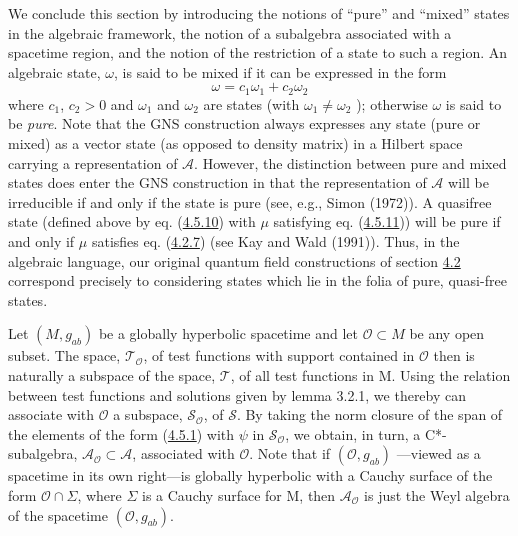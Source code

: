 \documentclass[11pt,a4paper]{article}
\begin{document}
We conclude this section by introducing the notions of ``pure'' and ``mixed'' states in the algebraic framework, the notion of a subalgebra associated with a spacetime region, and the notion of the restriction of a state to such a region. An algebraic state, \(\omega\), is said to be mixed if it can be expressed in the form
\begin{equation*}
\omega = c_1 \omega_1 + c_2 \omega_2 \tag{4.5.17}\label{eq:4.5.17}
\end{equation*}
where \(c_1\), \(c_2 > 0\) and \(\omega_1\) and \(\omega_2\) are states (with \(\omega_1 \neq \omega_2\) ); otherwise \(\omega\) is said to be \emph{pure}. Note that the GNS construction always expresses any state (pure or mixed) as a vector state (as opposed to density matrix) in a Hilbert space carrying a representation of \(\mathcal{A}\). However, the distinction between pure and mixed states does enter the GNS construction in that the representation of \(\mathcal{A}\) will be irreducible if \hypertarget{source-97}{} and only if the state is pure (see, e.g., Simon (1972)). A quasifree state (defined above by eq. (\hyperref[eq:4.5.10]{4.5.10}) with \(\mu\) satisfying eq. (\hyperref[eq:4.5.11]{4.5.11})) will be pure if and only if \(\mu\) satisfies eq. (\hyperref[eq:4.2.7]{4.2.7}) (see Kay and Wald (1991)). Thus, in the algebraic language, our original quantum field constructions of section \hyperlink{sec:4.2}{4.2} correspond precisely to considering states which lie in the folia of pure, quasi-free states.

Let \((M, g_{ab})\) be a globally hyperbolic spacetime and let \(\mathcal{O} \subset M\) be any open subset. The space, \(\mathcal{T}_{\mathcal{O}}\), of test functions with support contained in \(\mathcal{O}\) then is naturally a subspace of the space, \(\mathcal{T}\), of all test functions in M. Using the relation between test functions and solutions given by lemma 3.2.1, we thereby can associate with \(\mathcal{O}\) a subspace, \(\mathcal S_{\mathcal O}\), of \(\mathcal S\). By taking the norm closure of the span of the elements of the form (\hyperref[eq:4.5.1]{4.5.1}) with \(\psi\) in \(\mathcal S_{\mathcal O}\), we obtain, in turn, a C*-subalgebra, \(\mathcal{A}_{\mathcal{O}} \subset \mathcal{A}\), associated with \(\mathcal{O}\). Note that if \((\mathcal{O}, g_{ab})\) ---viewed as a spacetime in its own right---is globally hyperbolic with a Cauchy surface of the form \(\mathcal{O} \cap \Sigma\), where \(\Sigma\) is a Cauchy surface for M, then \(\mathcal{A}_{\mathcal{O}}\) is just the Weyl algebra of the spacetime \((\mathcal{O}, g_{ab})\).
\end{document}

